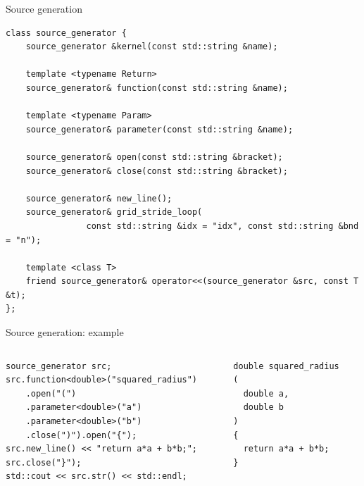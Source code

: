 \documentclass[@BEAMER_OPTIONS@]{beamer}
\begin{document}
\begin{frame}[fragile]{Source generation}
    \begin{exampleblock}{}
        \begin{lstlisting}
class source_generator {
    source_generator &kernel(const std::string &name);

    template <typename Return>
    source_generator& function(const std::string &name);

    template <typename Param>
    source_generator& parameter(const std::string &name);

    source_generator& open(const std::string &bracket);
    source_generator& close(const std::string &bracket);

    source_generator& new_line();
    source_generator& grid_stride_loop(
                const std::string &idx = "idx", const std::string &bnd = "n");

    template <class T>
    friend source_generator& operator<<(source_generator &src, const T &t);
};
        \end{lstlisting}
    \end{exampleblock}
\end{frame}

\begin{frame}[fragile]{Source generation: example}
    \begin{columns}
        \begin{column}{0.45\textwidth}
            \begin{exampleblock}{}
                \begin{lstlisting}
source_generator src;
src.function<double>("squared_radius")
    .open("(")
    .parameter<double>("a")
    .parameter<double>("b")
    .close(")").open("{");
src.new_line() << "return a*a + b*b;";
src.close("}");
std::cout << src.str() << std::endl;
                \end{lstlisting}
            \end{exampleblock}
        \end{column}
        \begin{column}{0.45\textwidth}
            \begin{exampleblock}{}
                \vspace{0.5\baselineskip}
                \begin{lstlisting}
double squared_radius
(
  double a,
  double b
)
{
  return a*a + b*b;
}
                \end{lstlisting}
                \vspace{0.5\baselineskip}
            \end{exampleblock}
        \end{column}
    \end{columns}
\end{frame}
\end{document}

